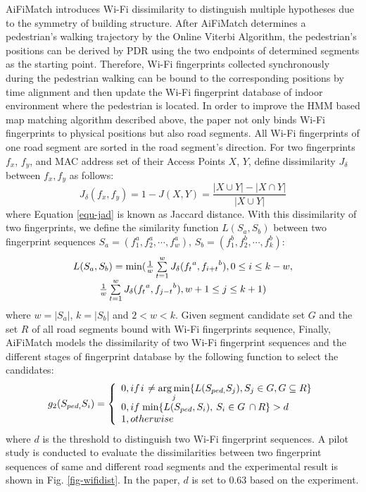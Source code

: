 \documentclass{llncs}
\begin{document}
AiFiMatch introduces Wi-Fi dissimilarity to distinguish multiple hypotheses due to the symmetry of building structure. After AiFiMatch determines a pedestrian's walking trajectory by the Online Viterbi Algorithm, the pedestrian's positions can be derived by PDR using the two endpoints of determined segments as the starting point. Therefore, Wi-Fi fingerprints collected synchronously during the pedestrian walking can be bound to the corresponding positions by time alignment and then update the Wi-Fi fingerprint database of indoor environment where the pedestrian is located. In order to improve the HMM based map matching algorithm described above, the paper not only binds Wi-Fi fingerprints to physical positions but also road segments. All Wi-Fi fingerprints of one road segment are sorted in the road segment's direction. For two fingerprints $f_x$, $f_y$, and MAC address set of their Access Points $X$, $Y$, define dissimilarity $J_{\delta}$ between $f_x,f_y$ as follows:
\begin{equation}
{J_\delta }(f_x,f_y) = 1 - J(X,Y) = \frac{{|X \cup Y| - |X \cap Y|}}{{|X \cup Y|}}
\label{equ-jad}
\end{equation}
where Equation \ref{equ-jad} is known as Jaccard distance. With this dissimilarity of two fingerprints, we define the similarity function $L(S_a, S_b)$ between two fingerprint sequences $S_a = (f_1^a,f_2^a,\cdots,f_w^a)$, $S_b = (f_1^b, f_2^b, \cdots, f_k^b)$:
\begin{equation}
\begin{array}{c}
L({S_a},{\rm{ }}{S_b}) = \min (\frac{1}{w}\sum\limits_{t = 1}^w {{J_\delta }({f_t}^a,{f_{i + t}}^b),0 \le i \le k - w,} \\
\frac{1}{w}\sum\limits_{t = 1}^w {{J_\delta }({f_t}^a,{f_{j - t}}^b),w + 1 \le j \le k + 1} )
\end{array}
\end{equation}
where $w=|S_a|$, $k=|S_b|$ and $2<w<k$. Given segment candidate set $G$ and the set $R$ of all road segments bound with Wi-Fi fingerprints sequence, Finally, AiFiMatch models the dissimilarity of two Wi-Fi fingerprint sequences and the different stages of fingerprint database by the following function to select the candidates: 
\begin{equation}
{g_2}({S_{ped,}}{S_i}) = \left\{ {\begin{array}{*{20}{l}}
	{0,if{\kern 1pt} i{\kern 1pt}  \ne \mathop {\arg \min }\limits_j \{ L({S_{ped,}}{S_j}),{S_j} \in G,G \subseteq R\} }\\
	{0,if{\kern 1pt} \min \{ L({S_{ped}},{S_i}),{\kern 1pt} {\kern 1pt} {S_i} \in G{\kern 1pt} {\kern 1pt}  \cap R\}  > d{\kern 1pt} {\kern 1pt} }\\
	{1,otherwise}
	\end{array}} \right.
\end{equation}
where $d$ is the threshold to distinguish two Wi-Fi fingerprint sequences. A pilot study is conducted to evaluate the dissimilarities between two fingerprint sequences of same and different road segments and the experimental result is shown in Fig. \ref{fig-wifidist}. In the paper, $d$ is set to $0.63$ based on the experiment. 
\end{document}
